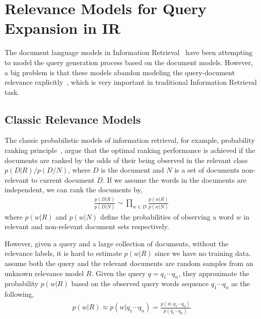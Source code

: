 
\section{Relevance Models for Query Expansion in IR}

The document language models in Information Retrieval~\citep{PonteCroft} have been attempting to model the query generation process based on the document models. However, a big problem is that these models abandon modeling the query-document relevance explicitly~\citep{Lavrenko-2001}, which is very important in traditional Information Retrieval task.

\subsection{Classic Relevance Models}

The classic probabilistic models of information retrieval, for example, probability ranking principle~\citep{Robertson-1997}, argue that the optimal ranking performance is achieved if the documents are ranked by the odds of their being observed in the relevant class $p(D|R) / p(D/N)$, where $D$ is the document and $N$ is a set of documents non-relevant to current document $D$. If we assume the words in the documents are independent, we can rank the documents by,
\begin{align}
\frac{p(D|R)}{p(D|N)} \sim \prod_{w \in D} \frac{p(w|R)}{p(w|N)}
\end{align}
where $p(w|R)$ and $p(w|N)$ define the probabilities of observing a word $w$ in relevant and non-relevant document sets respectively. 

However, given a query and a large collection of documents, without the relevance labels, it is hard to estimate $p(w|R)$ since we have no training data. \cite{Lavrenko-2001} assume both the query and the relevant documents are random samples from an unknown relevance model $R$. Given the query $q = q_1 \cdots q_n$, they approximate the probability $p(w|R)$ based on the observed query words sequence $q_1 \cdots q_n$ as the following,
\begin{align}
p(w|R) \approx p(w|q_1 \cdots q_n) = \frac{p(w,q_1 \cdots q_n)}{p(q_1 \cdots q_n)}
\end{align}

